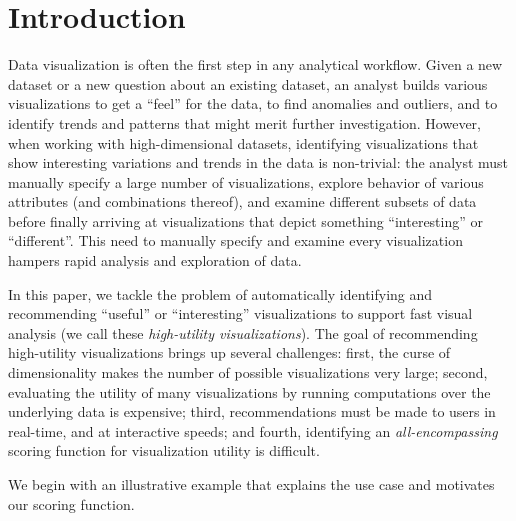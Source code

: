 
\section{Introduction}
\label{sec:introduction}
Data visualization is often the first step in any analytical workflow. 
Given a new dataset or a new question about an existing dataset, an analyst builds
various visualizations to get a ``feel'' for the data, to find anomalies and outliers, 
and to identify trends and patterns that might merit further investigation. 
However, when working with high-dimensional datasets, identifying visualizations that
show interesting variations and trends in the data is non-trivial:
the analyst must manually specify a large number of visualizations, explore behavior of various
attributes (and combinations thereof), and examine different subsets of data before finally 
arriving at visualizations that depict something ``interesting'' or ``different''.
This need to manually specify and examine every visualization hampers rapid analysis 
and exploration of data.

In this paper, we tackle the problem of automatically identifying and recommending 
``useful'' or ``interesting'' visualizations to support fast visual analysis (we call these {\em high-utility visualizations}).
The goal of recommending high-utility visualizations brings up several challenges: first,
the curse of dimensionality makes the number of possible visualizations very large;
second, evaluating the utility of many visualizations by running computations over the 
underlying data is expensive; 
third, recommendations must be made to users in real-time, and at interactive speeds;
and fourth, identifying an {\em all-encompassing} scoring function for visualization utility is difficult. 

We begin with an illustrative example that explains the \SeeDB use case and motivates our
scoring function. 



